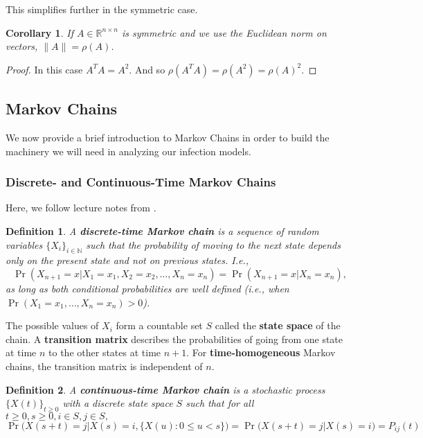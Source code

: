 \documentclass[11pt]{article}
\newtheorem{corollary}{Corollary}[theorem]
\newtheorem{definition}{Definition}[section]
\begin{document}
This simplifies further in the symmetric case.

\begin{corollary} \label{cor:matrix_norm}
If $A\in \mathbb{R}^{n\times n}$ is symmetric and we use the Euclidean norm on vectors, $\|A\| = \rho(A)$.
\end{corollary}

\begin{proof}
In this case $A^T A = A^2$. And so $\rho(A^T A) = \rho(A^2) = \rho(A)^2$.
\end{proof}


\subsection{Markov Chains}
We now provide a brief introduction to Markov Chains in order to build the machinery we will need in analyzing our infection models.

\subsubsection{Discrete- and Continuous-Time Markov Chains}

Here, we follow lecture notes from \cite{sigman:ctmc}.

\begin{definition}
A \textbf{discrete-time Markov chain} is a sequence of random variables $\{X_i\}_{i\in \mathbb{N}}$ such that the probability of moving to the next state depends only on the present state and not on previous states. I.e.,
$$\Pr(X_{n+1} = x | X_1 = x_1,X_2 = x_2,\ldots,X_n=x_n) = \Pr(X_{n+1}=x|X_n=x_n),$$
as long as both conditional probabilities are well defined (i.e., when $\Pr(X_1=x_1,\ldots,X_n=x_n)>0$).
\end{definition}

The possible values of $X_i$ form a countable set $S$ called the \textbf{state space} of the chain. A \textbf{transition matrix} describes the probabilities of going from one state at time $n$ to the other states at time $n+1$. For \textbf{time-homogeneous} Markov chains, the transition matrix is independent of $n$.

\begin{definition}
A \textbf{continuous-time Markov chain} is a stochastic process $\{X(t)\}_{t\geq 0}$ with a discrete state space $S$ such that for all $t\geq 0,s\geq 0, i\in S, j\in S,$
$$\Pr\Big(X(s+t)=j |X(s)=i,\{X(u):0\leq u<s\}\Big) = \Pr\Big(X(s+t) = j|X(s)=i\Big) = P_{ij}(t)$$
\end{definition}
\end{document}
